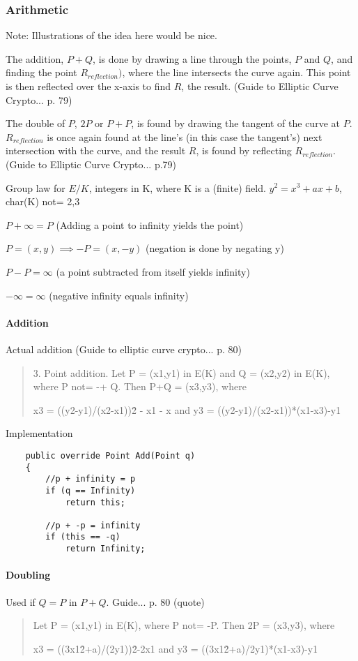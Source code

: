 \subsubsection{Arithmetic}

Note: Illustrations of the idea here would be nice.

The addition, \(P + Q\), is done by drawing a line through the points, \(P\) and \(Q\),
and finding the point \(R_{reflection})\), where the line intersects the curve again. This point is
then reflected over the x-axis to find \(R\), the result. (Guide to Elliptic Curve Crypto... p. 79)

The double of \(P\), \(2P\) or \(P+P\), is found by drawing the tangent of the curve at \(P\).
\(R_{reflection}\) is once again found at the line's (in this case the tangent's) next intersection
with the curve, and the result \(R\), is found by reflecting \(R_{reflection}\). (Guide to Elliptic Curve Crypto... p.79)

Group law for \(E/K\), integers in K, where K is a (finite) field.
\(y^2 = x^3 + ax + b\), char(K) not= 2,3

\(P + \infty = P\) (Adding a point to infinity yields the point)

\(P=(x,y) \implies -P=(x,-y)\) (negation is done by negating y)

\(P - P = \infty\) (a point subtracted from itself yields infinity)

\(-\infty = \infty\) (negative infinity equals infinity)

\paragraph{Addition}

Actual addition (Guide to elliptic curve crypto... p. 80)
\begin{quote}
	3. Point addition. Let P = (x1,y1) in E(K) and Q = (x2,y2) in E(K), where P not= -+ Q.
	Then P+Q = (x3,y3), where
	
	x3 = ((y2-y1)/(x2-x1))\^2 - x1 - x    and    y3 = ((y2-y1)/(x2-x1))*(x1-x3)-y1
\end{quote}

Implementation
\begin{verbatim}
	public override Point Add(Point q)
	{
	    //p + infinity = p
	    if (q == Infinity)
	        return this;

	    //p + -p = infinity
	    if (this == -q)
	        return Infinity;
\end{verbatim}

\paragraph{Doubling}

Used if \(Q = P\) in \(P + Q\). Guide... p. 80 (quote)
\begin{quote}
	Let P = (x1,y1) in E(K), where P not= -P. Then 2P = (x3,y3), where
	
	x3 = ((3x1\^2+a)/(2y1))\^2-2x1    and    y3 = ((3x1\^2+a)/2y1)*(x1-x3)-y1
\end{quote}